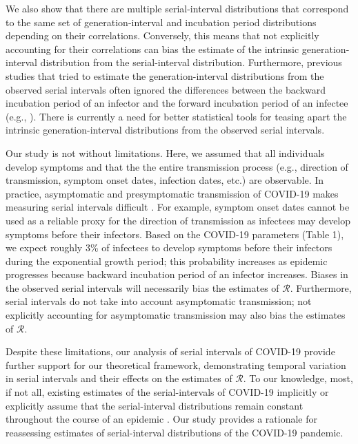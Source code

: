 \documentclass[12pt]{article}
\newcommand{\RR}{\ensuremath{{\mathcal R}}\xspace}
\begin{document}
We also show that there are multiple serial-interval distributions that correspond to the same set of generation-interval and incubation period distributions depending on their correlations.
Conversely, this means that not explicitly accounting for their correlations can bias the estimate of the intrinsic generation-interval distribution from the serial-interval distribution.
Furthermore, previous studies that tried to estimate the generation-interval distributions from the observed serial intervals often ignored the differences between the backward incubation period of an infector and the forward incubation period of an infectee (e.g., \cite{klinkenberg2011correlation, ganyani2020estimating}).
There is currently a need for better statistical tools for teasing apart the intrinsic generation-interval distributions from the observed serial intervals.

Our study is not without limitations.
Here, we assumed that all individuals develop symptoms and that the the entire transmission process (e.g., direction of transmission, symptom onset dates, infection dates, etc.) are observable.
In practice, asymptomatic and presymptomatic transmission of COVID-19 makes measuring serial intervals difficult \citep{bai2020presumed,he2020temporal,wei2020presymptomatic}.
For example, symptom onset dates cannot be used as a reliable proxy for the direction of transmission as infectees may develop symptoms before their infectors.
Based on the COVID-19 parameters (Table 1), we expect roughly 3\% of infectees to develop symptoms before their infectors during the exponential growth period; 
this probability increases as epidemic progresses because backward incubation period of an infector increases.
Biases in the observed serial intervals will necessarily bias the estimates of \RR. 
Furthermore, serial intervals do not take into account asymptomatic transmission; 
not explicitly accounting for asymptomatic transmission may also bias the estimates of \RR \citep{park2020time}.

Despite these limitations, our analysis of serial intervals of COVID-19 provide further support for our theoretical framework, demonstrating temporal variation in serial intervals and their effects on the estimates of \RR.
To our knowledge, most, if not all, existing estimates of the serial-intervals of COVID-19 implicitly or explicitly assume that the serial-interval distributions remain constant throughout the course of an epidemic \citep{du2020serial, he2020temporal, nishiura2020serial,tindale2020transmission,zhao2020estimating,zhang2020evolving}.
Our study provides a rationale for reassessing estimates of serial-interval distributions of the COVID-19 pandemic.
\end{document}
